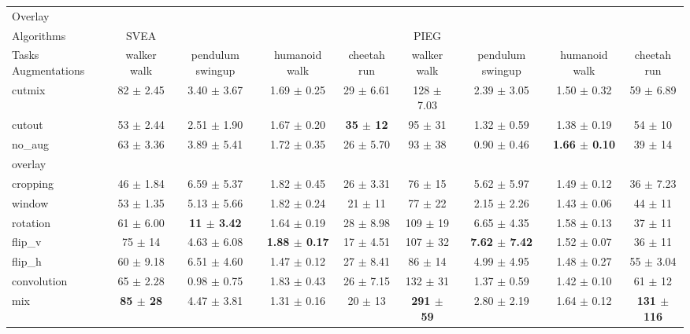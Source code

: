 \begin{tabular}{lcccccccc}
Overlay & & & & & & & & \\
Algorithms & SVEA & & & & PIEG & & & \\
Tasks Augmentations & walker walk & pendulum swingup & humanoid walk & cheetah run & walker walk & pendulum swingup & humanoid walk & cheetah run \\
cutmix          & 82 $\pm$ 2.45 & 3.40 $\pm$ 3.67 & 1.69 $\pm$ 0.25 & 29 $\pm$ 6.61 & 128 $\pm$ 7.03 & 2.39 $\pm$ 3.05 & 1.50 $\pm$ 0.32 & 59 $\pm$ 6.89 \\
cutout          & 53 $\pm$ 2.44 & 2.51 $\pm$ 1.90 & 1.67 $\pm$ 0.20 & \textbf{35 $\pm$ 12} & 95 $\pm$ 31 & 1.32 $\pm$ 0.59 & 1.38 $\pm$ 0.19 & 54 $\pm$ 10 \\
no\_aug         & 63 $\pm$ 3.36 & 3.89 $\pm$ 5.41 & 1.72 $\pm$ 0.35 & 26 $\pm$ 5.70 & 93 $\pm$ 38 & 0.90 $\pm$ 0.46 & \textbf{1.66 $\pm$ 0.10} & 39 $\pm$ 14 \\
overlay         &  &  &  &  &  &  &  &  \\
cropping        & 46 $\pm$ 1.84 & 6.59 $\pm$ 5.37 & 1.82 $\pm$ 0.45 & 26 $\pm$ 3.31 & 76 $\pm$ 15 & 5.62 $\pm$ 5.97 & 1.49 $\pm$ 0.12 & 36 $\pm$ 7.23 \\
window          & 53 $\pm$ 1.35 & 5.13 $\pm$ 5.66 & 1.82 $\pm$ 0.24 & 21 $\pm$ 11 & 77 $\pm$ 22 & 2.15 $\pm$ 2.26 & 1.43 $\pm$ 0.06 & 44 $\pm$ 11 \\
rotation        & 61 $\pm$ 6.00 & \textbf{11 $\pm$ 3.42} & 1.64 $\pm$ 0.19 & 28 $\pm$ 8.98 & 109 $\pm$ 19 & 6.65 $\pm$ 4.35 & 1.58 $\pm$ 0.13 & 37 $\pm$ 11 \\
flip\_v         & 75 $\pm$ 14 & 4.63 $\pm$ 6.08 & \textbf{1.88 $\pm$ 0.17} & 17 $\pm$ 4.51 & 107 $\pm$ 32 & \textbf{7.62 $\pm$ 7.42} & 1.52 $\pm$ 0.07 & 36 $\pm$ 11 \\
flip\_h         & 60 $\pm$ 9.18 & 6.51 $\pm$ 4.60 & 1.47 $\pm$ 0.12 & 27 $\pm$ 8.41 & 86 $\pm$ 14 & 4.99 $\pm$ 4.95 & 1.48 $\pm$ 0.27 & 55 $\pm$ 3.04 \\
convolution     & 65 $\pm$ 2.28 & 0.98 $\pm$ 0.75 & 1.83 $\pm$ 0.43 & 26 $\pm$ 7.15 & 132 $\pm$ 31 & 1.37 $\pm$ 0.59 & 1.42 $\pm$ 0.10 & 61 $\pm$ 12 \\
mix             & \textbf{85 $\pm$ 28} & 4.47 $\pm$ 3.81 & 1.31 $\pm$ 0.16 & 20 $\pm$ 13 & \textbf{291 $\pm$ 59} & 2.80 $\pm$ 2.19 & 1.64 $\pm$ 0.12 & \textbf{131 $\pm$ 116} \\
\end{tabular}